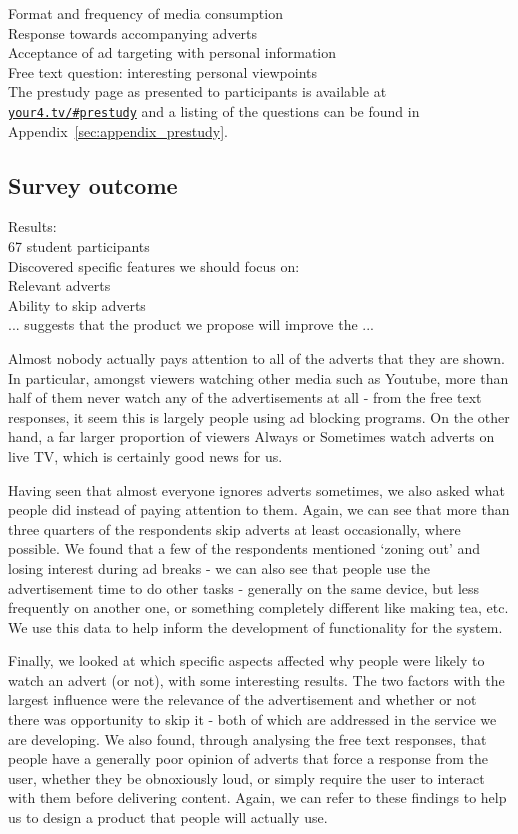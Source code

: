 Format and frequency of media consumption\\
Response towards accompanying adverts\\
Acceptance of ad targeting with personal information\\
Free text question: interesting personal viewpoints\\





The prestudy page as presented to participants is available at \href{http://your4.tv/\#prestudy}{\texttt{your4.tv/\#prestudy}} and a listing of the questions can be found in Appendix~\ref{sec:appendix_prestudy}. %


\subsection{Survey outcome}

Results:\\
67 student participants\\
Discovered specific features we should focus on:\\
Relevant adverts\\
Ability to skip adverts\\
... suggests that the product we propose will improve the ...

Almost nobody actually pays attention to all of the adverts that they are shown. In particular, amongst viewers watching other media such as Youtube, more than half of them never watch any of the advertisements at all - from the free text responses, it seem this is largely people using ad blocking programs. On the other hand, a far larger proportion of viewers Always or Sometimes watch adverts on live TV, which is certainly good news for us.

Having seen that almost everyone ignores adverts sometimes, we also asked what people did instead of paying attention to them. Again, we can see that more than three quarters of the respondents skip adverts at least occasionally, where possible. We found that a few of the respondents mentioned `zoning out' and losing interest during ad breaks - we can also see that people use the advertisement time to do other tasks - generally on the same device, but less frequently on another one, or something completely different like making tea, etc. We use this data to help inform the development of functionality for the system.

Finally, we looked at which specific aspects affected why people were likely to watch an advert (or not), with some interesting results. The two factors with the largest influence were the relevance of the advertisement and whether or not there was opportunity to skip it - both of which are addressed in the service we are developing. We also found, through analysing the free text responses, that people have a generally poor opinion of adverts that force a response from the user, whether they be obnoxiously loud, or simply require the user to interact with them before delivering content. Again, we can refer to these findings to help us to design a product that people will actually use. 
